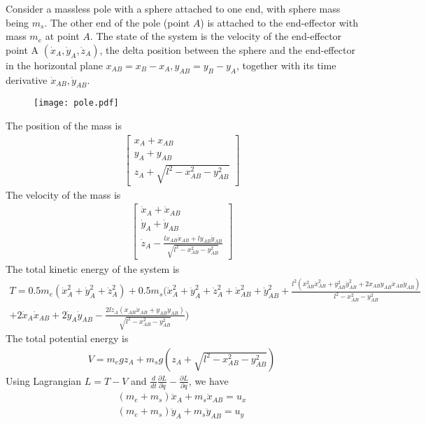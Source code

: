 \documentclass{article}
\begin{document}
Consider a massless pole with a sphere attached to one end, with sphere mass being $m_s$. The other end of the pole (point $A$) is attached to the end-effector with mass $m_e$ at point $A$. The state of the system is the velocity of the end-effector point A $(\dot{x}_A, \dot{y}_A, \dot{z}_A)$, the delta position between the sphere and the end-effector in the horizontal plane $x_{AB} = x_B - x_A, y_{AB} = y_B-y_A$, together with its time derivative $\dot{x}_{AB}, \dot{y}_{AB}$.

\begin{figure}
	\centering
	\texttt{[image: pole.pdf]}
\end{figure}

The position of the mass is
\begin{align}
	\begin{bmatrix}
		x_A + x_{AB}\\
		y_A + y_{AB}\\
		z_A + \sqrt{l^2 - x_{AB}^2 - y_{AB}^2}
	\end{bmatrix}
\end{align}
The velocity of the mass is
\begin{align}
	\begin{bmatrix}
		\dot{x}_A + \dot{x}_{AB}\\
		\dot{y}_A + \dot{y}_{AB}\\
		\dot{z}_A - \frac{lx_{AB}\dot{x}_{AB} + ly_{AB}\dot{y}_{AB}}{\sqrt{l^2-x_{AB}^2 - y_{AB}^2}}
	\end{bmatrix}
\end{align}
The total kinetic energy of the system is
\begin{multline}
	T = 0.5 m_e (\dot{x}_A^2 + \dot{y}_A^2 +\dot{z}_A^2) + 0.5 m_s(\dot{x}_A^2 + \dot{y}_A^2 + \dot{z}_A^2 + \dot{x}_{AB}^2 + \dot{y}_{AB}^2 + \frac{l^2(x_{AB}^2\dot{x}_{AB}^2 + y_{AB}^2\dot{y}_{AB}^2 + 2x_{AB}y_{AB}\dot{x}_{AB}\dot{y}_{AB})}{l^2-x_{AB}^2-y_{AB}^2}\\
	+ 2\dot{x}_A\dot{x}_{AB} + 2\dot{y}_A\dot{y}_{AB} - \frac{2l\dot{z}_A(x_{AB}\dot{x}_{AB}+y_{AB}\dot{y}_{AB})}{\sqrt{l^2-x_{AB}^2-y_{AB}^2}})
\end{multline}
The total potential energy is
\begin{align}
	V = m_egz_A + m_sg(z_A + \sqrt{l^2-x_{AB}^2-y_{AB}^2})
\end{align}
Using Lagrangian $L = T-V$ and $\frac{d}{dt}\frac{\partial L}{\partial \dot{q}}-\frac{\partial L}{\partial q}$, we have
\begin{align}
	(m_e + m_s)\ddot{x}_A + m_s\ddot{x}_{AB} = u_x\\
	(m_e + m_s)\ddot{y}_A + m_s\ddot{y}_{AB} = u_y
\end{align}
\end{document}
